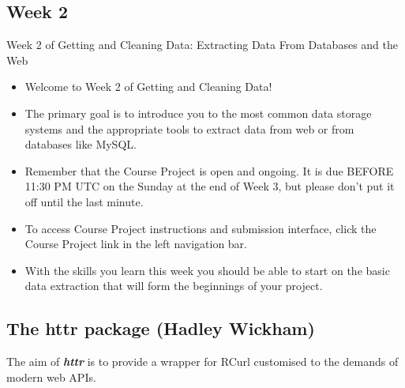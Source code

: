 \documentclass[12pt]{article}
\begin{document}
\newpage
\subsection*{Week 2} 
Week 2 of Getting and Cleaning Data: Extracting Data From Databases and the Web

\begin{itemize}
\item Welcome to Week 2 of Getting and Cleaning Data! 

\item The primary goal is to introduce you to the most common data storage systems and the appropriate tools to extract data from web or from databases like MySQL. 

\item Remember that the Course Project is open and ongoing. It is due BEFORE 11:30 PM UTC on the Sunday at the end of Week 3, but please don't put it off until the last minute. 
\item To access Course Project instructions and submission interface, click the Course Project link in the left navigation bar.  


\item With the skills you learn this week you should be able to start on the basic data extraction that will form the beginnings of your project.
\end{itemize} 
\newpage
\subsection*{The httr package (Hadley Wickham)}
The aim of \textbf{\textit{httr}} is to provide a wrapper for RCurl customised to the demands of modern web APIs.
\end{document}
